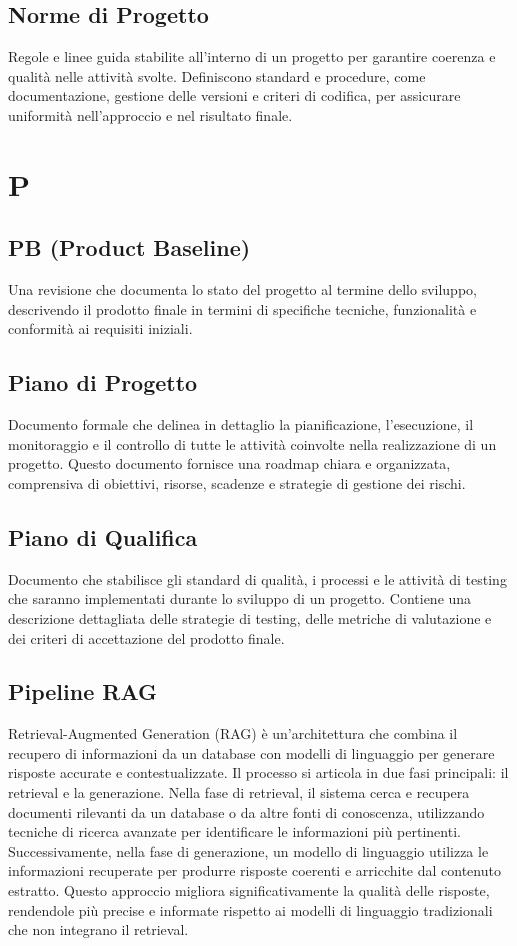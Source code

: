 \documentclass{article}
\begin{document}
\subsection{Norme di Progetto}
Regole e linee guida stabilite all'interno di un progetto per garantire coerenza e qualità nelle attività svolte. Definiscono standard e procedure, come documentazione, gestione delle versioni e criteri di codifica, per assicurare uniformità nell'approccio e nel risultato finale.

\newpage

\section{P}

\subsection{PB (Product Baseline)}
Una revisione che documenta lo stato del progetto al termine dello sviluppo, descrivendo il prodotto finale in termini di specifiche tecniche, funzionalità e conformità ai requisiti iniziali.

\subsection{Piano di Progetto}
Documento formale che delinea in dettaglio la pianificazione, l'esecuzione, il monitoraggio e il controllo di tutte le attività coinvolte nella realizzazione di un progetto. Questo documento fornisce una roadmap chiara e organizzata, comprensiva di obiettivi, risorse, scadenze e strategie di gestione dei rischi.

\subsection{Piano di Qualifica}
Documento che stabilisce gli standard di qualità, i processi e le attività di testing che saranno implementati durante lo sviluppo di un progetto. Contiene una descrizione dettagliata delle strategie di testing, delle metriche di valutazione e dei criteri di accettazione del prodotto finale.

\subsection{Pipeline RAG}
Retrieval-Augmented Generation (RAG) è un'architettura che combina il recupero di informazioni da un database con modelli di linguaggio per generare risposte accurate e contestualizzate. Il processo si articola in due fasi principali: il retrieval e la generazione. Nella fase di retrieval, il sistema cerca e recupera documenti rilevanti da un database o da altre fonti di conoscenza, utilizzando tecniche di ricerca avanzate per identificare le informazioni più pertinenti. Successivamente, nella fase di generazione, un modello di linguaggio utilizza le informazioni recuperate per produrre risposte coerenti e arricchite dal contenuto estratto. Questo approccio migliora significativamente la qualità delle risposte, rendendole più precise e informate rispetto ai modelli di linguaggio tradizionali che non integrano il retrieval.
\end{document}
